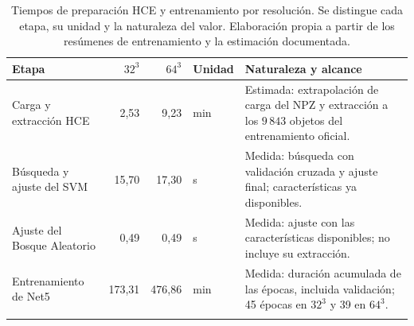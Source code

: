 \begin{table}[htbp]\centering\small
\caption{Tiempos de preparación HCE y entrenamiento por resolución. Se distingue cada etapa, su unidad y la naturaleza del valor. Elaboración propia a partir de los resúmenes de entrenamiento y la estimación documentada.}\label{tab:entrenamiento-final}
\setlength{\tabcolsep}{4pt}
\begin{tabularx}{\textwidth}{@{}>{\raggedright\arraybackslash}p{3.2cm}rrl>{\raggedright\arraybackslash}X@{}}\toprule
Etapa & $32^3$ & $64^3$ & Unidad & Naturaleza y alcance \\\midrule
Carga y extracción HCE & 2,53 & 9,23 & min & Estimada: extrapolación de carga del NPZ y extracción a los $9\,843$ objetos del entrenamiento oficial. \\ \addlinespace
Búsqueda y ajuste del SVM & 15,70 & 17,30 & s & Medida: búsqueda con validación cruzada y ajuste final; características ya disponibles. \\ \addlinespace
Ajuste del Bosque Aleatorio & 0,49 & 0,49 & s & Medida: ajuste con las características disponibles; no incluye su extracción. \\ \addlinespace
Entrenamiento de Net5 & 173,31 & 476,86 & min & Medida: duración acumulada de las épocas, incluida validación; 45 épocas en $32^3$ y 39 en $64^3$. \\ \addlinespace
\bottomrule\end{tabularx}
\end{table}
